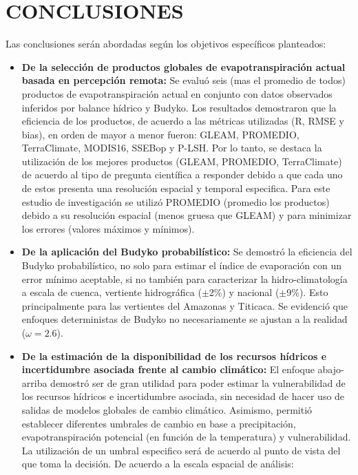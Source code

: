 \documentclass[12pt]{article}
\begin{document}
\clearpage
\thispagestyle{empty}

\clearpage

\vspace*{0.5mm}
\section{CONCLUSIONES}

\thispagestyle{empty}

Las conclusiones serán abordadas según los objetivos específicos planteados:

\begin{itemize}
    \item \textbf{De la selección de productos globales de evapotranspiración actual basada en percepción remota:} Se evaluó seis (mas el promedio de todos) productos de evapotranspiración actual en conjunto con datos observados inferidos por balance hídrico y Budyko. Los resultados demostraron que la eficiencia de los productos, de acuerdo a las métricas utilizadas (R, RMSE y bias), en orden de mayor a menor fueron: GLEAM, PROMEDIO, TerraClimate, MODIS16, SSEBop y P-LSH. Por lo tanto, se destaca la utilización de los mejores productos (GLEAM, PROMEDIO, TerraClimate) de acuerdo al tipo de pregunta científica a responder debido a que cada uno de estos presenta una resolución espacial y temporal especifica. Para este estudio de investigación se utilizó PROMEDIO (promedio los productos) debido a su resolución espacial (menos gruesa que GLEAM) y para minimizar los errores (valores máximos y mínimos).
   
    \item \textbf{De la aplicación del Budyko probabilístico:}
    Se demostró la eficiencia del Budyko probabilístico, no solo para estimar el índice de evaporación con un error mínimo aceptable, si no también para caracterizar la hidro-climatología a escala de cuenca, vertiente hidrográfica ($\pm$2\%) y nacional ($\pm$9\%). Esto principalmente para las vertientes del Amazonas y Titicaca. Se evidenció que enfoques deterministas de Budyko no necesariamente se ajustan a la realidad ($\omega = 2.6$).
    
    \item \textbf{De la estimación de la disponibilidad de los recursos hídricos e incertidumbre asociada frente al cambio climático:} El enfoque abajo-arriba demostró ser de gran utilidad para poder estimar la vulnerabilidad de los recursos hídricos e incertidumbre asociada, sin necesidad de hacer uso de salidas de modelos globales de cambio climático. Asimismo, permitió establecer diferentes umbrales de cambio en base a precipitación, evapotranspiración potencial (en función de la temperatura) y vulnerabilidad. La utilización de un umbral especifico será de acuerdo al punto de vista del que toma la decisión. De acuerdo a la escala espacial de análisis:
    

\end{itemize}
\end{document}

